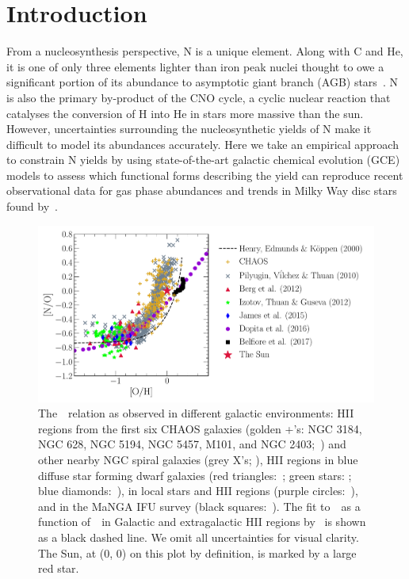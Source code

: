 \documentclass[ms.tex]{subfiles}
\begin{document}
\section{Introduction}
\label{sec:intro}

From a nucleosynthesis perspective, N is a unique element.
Along with C and He, it is one of only three elements lighter
than iron peak nuclei thought to owe a significant portion of its abundance
to asymptotic giant branch (AGB) stars~\citep[e.g.][]{Johnson2019}.
N is also the primary by-product of the CNO cycle, a cyclic nuclear reaction
that catalyses the conversion of H into He in stars more massive than the sun.
However, uncertainties surrounding the nucleosynthetic yields of N make it
difficult to model its abundances accurately.
Here we take an empirical approach to constrain N yields by using
state-of-the-art galactic chemical evolution (GCE) models to assess which
functional forms describing the yield can reproduce recent observational
data for gas phase abundances and trends in Milky Way disc stars found
by~\citet{Vincenzo2021}.

\begin{figure}
\centering
\includegraphics[scale = 0.6]{no_oh_observed.pdf}
\caption{
	The~\ohno~relation as observed in different galactic environments:
	HII regions from the first six CHAOS galaxies (golden +'s: NGC 3184, NGC
	628, NGC 5194, NGC 5457, M101, and NGC 2403;~\citealp{Berg2020,
	Skillman2020, Rogers2021}) and other nearby NGC spiral galaxies (grey X's;
	\citealp[][``ONS'' calibration]{Pilyugin2010}), HII regions in blue diffuse
	star forming dwarf galaxies (red triangles:~\citealp{Berg2012}; green stars:
	\citealp{Izotov2012}; blue diamonds:~\citealp{James2015}), in local stars
	and HII regions (purple circles:~\citealp{Dopita2016}), and in the MaNGA
	IFU survey (black squares:~\citealp{Belfiore2017}).
	The fit to~\no~as a function of~\oh~in Galactic and extragalactic HII
	regions by~\citet{Henry2000} is shown as a black dashed line.
	We omit all uncertainties for visual clarity.
	The Sun, at (0, 0) on this plot by definition, is marked by a large red
	star.
}
\label{fig:no_oh_observed}
\end{figure}
\end{document}
